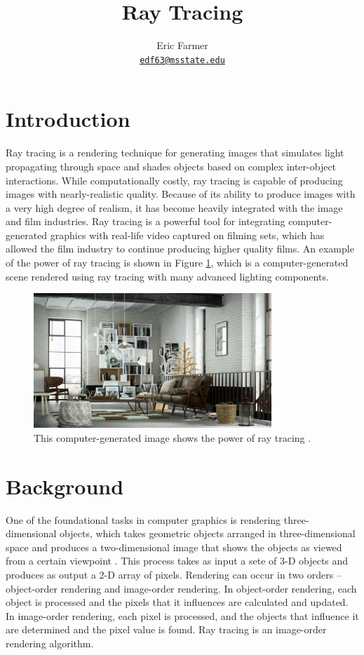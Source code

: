 \documentclass[letterpaper, 11pt, onecolumn, oneside]{article}
\title{
    Ray Tracing\\
    \large{\assignmentname}
    }
\author{Eric Farmer \\ \href{mailto:edf63@msstate.edu}{\texttt{edf63@msstate.edu}}}
\date{\assignmentdate}
\begin{document}
\null  %
\nointerlineskip  %
\vfill
\let\snewpage \newpage
\let\newpage \relax
\maketitle
\let \newpage \snewpage
\vfill
\clearpage

\section{Introduction}
Ray tracing is a rendering technique for generating images that simulates light propagating through space and shades objects based on complex inter-object interactions.
While computationally costly, ray tracing is capable of producing images with nearly-realistic quality.
Because of its ability to produce images with a very high degree of realism, it has become heavily integrated with the image and film industries.
Ray tracing is a powerful tool for integrating computer-generated graphics with real-life video captured on filming sets, which has allowed the film industry to continue producing higher quality films.
An example of the power of ray tracing is shown in Figure \ref{fig:nvidia-demo}, which is a computer-generated scene rendered using ray tracing with many advanced lighting components.

\begin{figure}[btp]
    \includegraphics[width=0.8\textwidth]{nvidia-demo.jpg}
    \centering
    \caption{This computer-generated image shows the power of ray tracing \cite{caulfield2019}.}
    \label{fig:nvidia-demo}
\end{figure}

\section{Background}
One of the foundational tasks in computer graphics is rendering three-dimensional objects, which takes geometric objects arranged in three-dimensional space and produces a two-dimensional image that shows the objects as viewed from a certain viewpoint \cite{stevemarschner2015}.
This process takes as input a sete of 3-D objects and produces as output a 2-D array of pixels.
Rendering can occur in two orders -- object-order rendering and image-order rendering.
In object-order rendering, each object is processed and the pixels that it influences are calculated and updated.
In image-order rendering, each pixel is processed, and the objects that influence it are determined and the pixel value is found.
Ray tracing is an image-order rendering algorithm.
\end{document}
